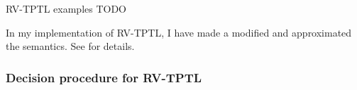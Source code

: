 \documentclass[a4paper]{article}
\newcommand{\tand}{\text{ and }}
\newcommand{\tor}{\text{ or }}
\newcommand{\tiff}{\text{ iff }}
\newcommand{\sn}{\bigcirc^+}
\newcommand{\wn}{\bigcirc^-}
\begin{document}
\begin{eg}{RV-TPTL examples}
  TODO
\end{eg}

In my implementation of RV-TPTL, I have made a modified and approximated the semantics. See  for details.

\subsubsection{Decision procedure for RV-TPTL}



\end{document}
